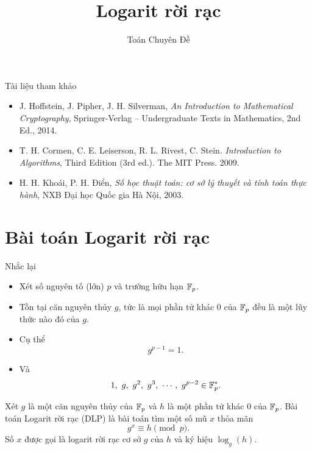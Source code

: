   
\title{Logarit rời rạc} 
 \author{Toán Chuyên Đề}   
   
\maketitle      

\begin{frame}{Tài liệu tham khảo}
  \begin{itemize}
  \item J. Hoffstein, J. Pipher, J. H. Silverman,
    \textit{An Introduction to Mathematical Cryptography},
    Springer-Verlag – Undergraduate Texts in Mathematics, 2nd Ed.,
    2014.
  \item T. H. Cormen, C. E. Leiserson, R. L. Rivest, C. Stein.  \textit{Introduction to Algorithms}, Third Edition (3rd ed.). The MIT Press. 2009.

  \item H. H. Khoái, P. H. Điển, \textit{Số học thuật toán: cơ sở lý thuyết và tính toán thực hành}, NXB Đại học Quốc gia Hà Nội, 2003.
  \end{itemize}
\end{frame}

\section{Bài toán Logarit rời rạc}
\begin{frame}{Nhắc lại}
  \begin{itemize}
  \item Xét số nguyên tố (lớn) $p$  và trường hữu hạn  $\mathbb{F}_p$.
  \item Tồn tại căn nguyên thủy $g$, tức là mọi phần tử khác $0$ của $\mathbb{F}_p$ đều là một lũy thức nào đó của $g$.
  \item Cụ thể 
    $$
    g^{p-1} = 1.
    $$
  \item Và 
    $$
    1,\ g,\ g^2,\ g^3,\ \cdots,\ g^{p-2} \in \F_p^*. 
    $$
  \end{itemize}
\end{frame}

\begin{frame}
  \begin{dfntn}
    Xét $g$ là một căn nguyên thủy của $\mathbb{F}_p$ và $h$ là một phần tử khác $0$ của $\mathbb{F}_p$. Bài toán Logarit rời rạc (DLP) là bài toán tìm một số mũ $x$ thỏa mãn 
    $$
    g^x \equiv h \pmod{p}.
    $$
Số $x$ được gọi là logarit rời rạc cơ sở  $g$ của $h$ và ký hiệu $\log_g(h)$. 
  \end{dfntn}
\end{frame}

